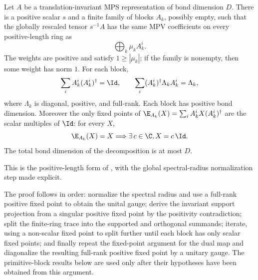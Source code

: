 \begin{theorem}%
    \label{thm:pgvwc07_ti_canonical_form}
    \leanok
    Let $A$ be a translation-invariant MPS representation of bond
    dimension $D$. There is a positive scalar $s$ and a finite family of
    blocks $A_k$, possibly empty, such that the globally rescaled tensor
    $s^{-1}A$ has the same MPV coefficients on every positive-length ring as
    \[
        \bigoplus_k \mu_k A_k^i.
    \]
    The weights are positive and satisfy $1\geq |\mu_k|$; if the family is
    nonempty, then some weight has norm $1$. For each block,
    \[
        \sum_i A_k^i(A_k^i)^\dagger = \Id,
        \qquad
        \sum_i (A_k^i)^\dagger \Lambda_k A_k^i = \Lambda_k,
    \]
    where $\Lambda_k$ is diagonal, positive, and full-rank. Each block has
    positive bond dimension. Moreover the only fixed points of
    $\E_{A_k}(X)=\sum_i A_k^iX(A_k^i)^\dagger$ are the scalar multiples of
    $\Id$: for every $X$,
    \[
        \E_{A_k}(X)=X \Longrightarrow  \exists\,c\in\C,  X = c\,\Id.
    \]
    The total bond dimension of the decomposition is at most $D$.

    This is the positive-length form of
    \cite[Theorem~4]{PerezGarcia2007Matrix}, with the global
    spectral-radius normalization step made explicit.
\end{theorem}

\begin{remark}\label{rem:pgvwc07_ti_canonical_source_order}
    The proof follows
    \cite[Theorem~4]{PerezGarcia2007Matrix} in order: normalize the
    spectral radius and use a full-rank positive fixed point to obtain the unital
    gauge; derive the invariant support projection from a singular positive fixed
    point by the positivity contradiction; split the finite-ring trace into the
    supported and orthogonal summands; iterate, using a non-scalar fixed point to
    split further until each block has only scalar fixed points; and finally
    repeat the fixed-point argument for the dual map and diagonalize the
    resulting full-rank positive fixed point by a unitary gauge. The
    primitive-block results below are used only after their hypotheses have been
    obtained from this argument.
\end{remark}

